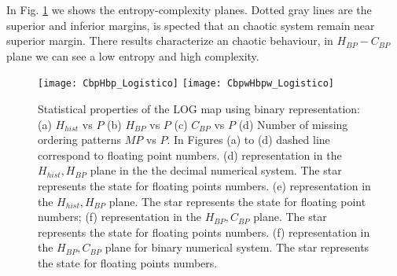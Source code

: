 In Fig. \ref{fig:LOG_HC} we shows the entropy-complexity planes.
Dotted gray lines are the superior and inferior margins, is spected that an chaotic system remain near superior margin.
There results characterize an chaotic behaviour, in $H_{BP}-C_{BP}$ plane we can see a low entropy and high complexity.

\begin{figure}
	\texttt{[image: CbpHbp\_Logistico]}
	\texttt{[image: CbpwHbpw\_Logistico]}
	\caption{Statistical properties of the LOG map using binary representation: (a) $H_{hist}$ vs $P$ (b) $H_{BP}$ vs $P$ (c) $C_{BP}$ vs $P$ (d) Number of missing ordering patterns $MP$ vs $P$. In Figures (a) to (d) dashed line correspond to floating point numbers. (d) representation in the $H_{hist},H_{BP}$ plane in the the decimal numerical system.  The star represents the state for floating points numbers. (e) representation in the $H_{hist},H_{BP}$ plane. The star represents the state for floating point numbers; (f) representation in the $H_{BP},C_{BP}$ plane.  The star represents the state for floating points numbers. (f) representation in the $H_{BP},C_{BP}$ plane for binary numerical system.  The star represents the state for floating points numbers. } \label{fig:LOG_HC}
\end{figure}
